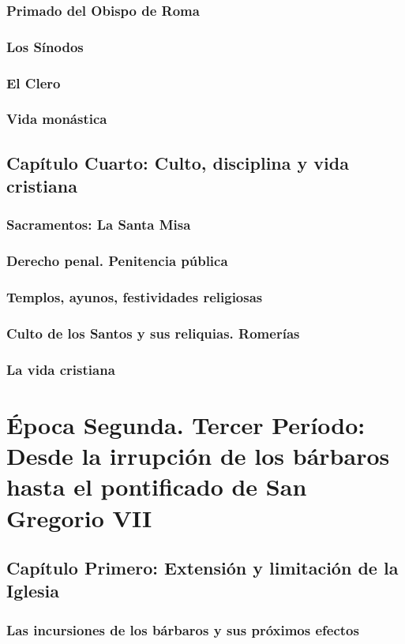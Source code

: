 \raggedbottom{} \documentclass[12pt, a4paper]{book}
\begin{document}
\section{Primado del Obispo de Roma}
\section{Los Sínodos}
\section{El Clero}
\section{Vida monástica}
\chapter{Capítulo Cuarto: Culto, disciplina y vida cristiana}
\section{Sacramentos: La Santa Misa}
\section{Derecho penal. Penitencia pública}
\section{Templos, ayunos, festividades religiosas}
\section{Culto de los Santos y sus reliquias. Romerías}
\section{La vida cristiana}
\part{Época Segunda. Tercer Período: Desde la irrupción de los bárbaros hasta el pontificado de San Gregorio VII}
\chapter{Capítulo Primero: Extensión y limitación de la Iglesia}
\section{Las incursiones de los bárbaros y sus próximos efectos}
\end{document}
